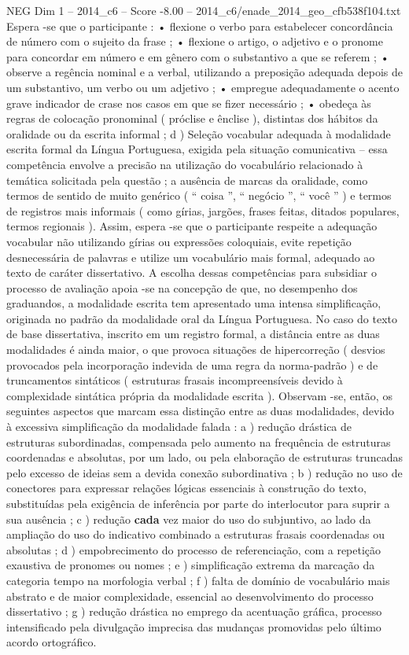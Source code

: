 \begin{textsample}{NEG Dim 1 – 2014\_c6 – Score -8.00 – 2014\_c6/enade\_2014\_geo\_cfb538f104.txt}
Espera -se que o participante : • flexione o verbo para estabelecer concordância de número com o sujeito da frase ; • flexione o artigo, o adjetivo e o pronome para concordar em número e em gênero com o substantivo a que se referem ; • observe a regência nominal e a verbal, utilizando a preposição adequada depois de um substantivo, um verbo ou um adjetivo ; • empregue adequadamente o acento grave indicador de crase nos casos em que se fizer necessário ; • obedeça às regras de colocação pronominal ( próclise e ênclise ), distintas dos hábitos da oralidade ou da escrita informal ; d ) Seleção vocabular adequada à modalidade escrita formal da Língua Portuguesa, exigida pela situação comunicativa – essa competência envolve a precisão na utilização do vocabulário relacionado à temática solicitada pela questão ; a ausência de marcas da oralidade, como termos de sentido de muito genérico ( “ coisa ”, “ negócio ”, “ você ” ) e termos de registros mais informais ( como gírias, jargões, frases feitas, ditados populares, termos regionais ).
Assim, espera -se que o participante respeite a adequação vocabular não utilizando gírias ou expressões coloquiais, evite repetição desnecessária de palavras e utilize um vocabulário mais formal, adequado ao texto de caráter dissertativo.
A escolha dessas competências para subsidiar o processo de avaliação apoia -se na concepção de que, no desempenho dos graduandos, a modalidade escrita tem apresentado uma intensa simplificação, originada no padrão da modalidade oral da Língua Portuguesa.
No caso do texto de base dissertativa, inscrito em um registro formal, a distância entre as duas modalidades é ainda maior, o que provoca situações de hipercorreção ( desvios provocados pela incorporação indevida de uma regra da norma-padrão ) e de truncamentos sintáticos ( estruturas frasais incompreensíveis devido à complexidade sintática própria da modalidade escrita ).
Observam -se, então, os seguintes aspectos que marcam essa distinção entre as duas modalidades, devido à excessiva simplificação da modalidade falada : a ) redução drástica de estruturas subordinadas, compensada pelo aumento na frequência de estruturas coordenadas e absolutas, por um lado, ou pela elaboração de estruturas truncadas pelo excesso de ideias sem a devida conexão subordinativa ; b ) redução no uso de conectores para expressar relações lógicas essenciais à construção do texto, substituídas pela exigência de inferência por parte do interlocutor para suprir a sua ausência ; c ) redução \textbf{cada} vez maior do uso do subjuntivo, ao lado da ampliação do uso do indicativo combinado a estruturas frasais coordenadas ou absolutas ; d ) empobrecimento do processo de referenciação, com a repetição exaustiva de pronomes ou nomes ; e ) simplificação extrema da marcação da categoria tempo na morfologia verbal ; f ) falta de domínio de vocabulário mais abstrato e de maior complexidade, essencial ao desenvolvimento do processo dissertativo ; g ) redução drástica no emprego da acentuação gráfica, processo intensificado pela divulgação imprecisa das mudanças promovidas pelo último acordo ortográfico.

\end{textsample}
